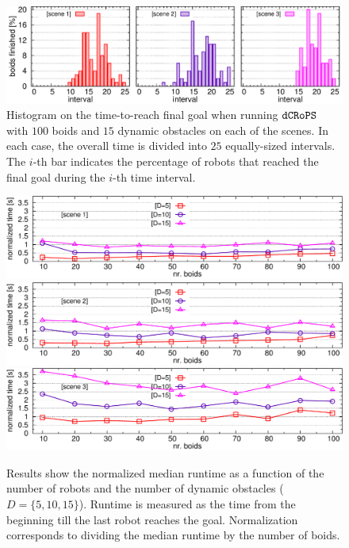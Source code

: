 \documentclass[letterpaper, 10pt, conference]{ieeeconf}
\newcommand{\Acronym}[1]{\ensuremath{{\small{\texttt{#1}}}}}
\newcommand{\Name}{\Acronym{dCRoPS}}
\begin{document}
\begin{figure}
\includegraphics[width=\textwidth]{figs/figResHists}
\caption{Histogram on the time-to-reach final goal when running $\Name$ with
$100$ boids and $15$ dynamic obstacles on each of the scenes. In each
  case, the overall time is divided into $25$ equally-sized
  intervals. The $i$-th bar indicates the 
 percentage of robots that reached the final goal during the $i$-th time interval.}
\label{fig:Hist}
\end{figure}


\begin{figure}
\includegraphics[width=\textwidth]{figs/figResScene1}\\
\includegraphics[width=\textwidth]{figs/figResScene2}\\
\includegraphics[width=\textwidth]{figs/figResScene3}
\caption{Results show the normalized median runtime as a function of
  the number of robots and the number of dynamic obstacles ($D =
  \{5,10,15\}$). Runtime is measured as the time from the beginning
  till the last robot reaches the goal. Normalization corresponds to dividing the median
  runtime by the number of boids. }
\label{fig:Res1}
\end{figure}
\end{document}
